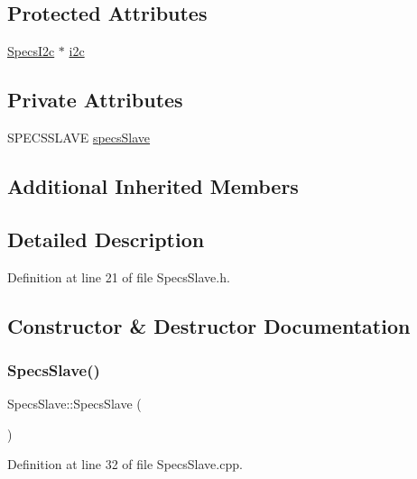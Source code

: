 \subsection*{Protected Attributes}
\begin{DoxyCompactItemize}
\item 
\hyperlink{classSpecsI2c}{Specs\+I2c} $\ast$ \hyperlink{classSpecsSlave_a5210e5a45c381ee29a830b42119ec1d3}{i2c}
\end{DoxyCompactItemize}
\subsection*{Private Attributes}
\begin{DoxyCompactItemize}
\item 
S\+P\+E\+C\+S\+S\+L\+A\+VE \hyperlink{classSpecsSlave_a98f0190d671023c3d874088ea2bd874b}{specs\+Slave}
\end{DoxyCompactItemize}
\subsection*{Additional Inherited Members}


\subsection{Detailed Description}


Definition at line 21 of file Specs\+Slave.\+h.



\subsection{Constructor \& Destructor Documentation}
\mbox{\label{classSpecsSlave_a4170ce73e2fd5ce2b8a7b8ef55226556}} 
\subsubsection{\texorpdfstring{Specs\+Slave()}{SpecsSlave()}}
{\footnotesize\ttfamily Specs\+Slave\+::\+Specs\+Slave (\begin{DoxyParamCaption}{ }\end{DoxyParamCaption})}



Definition at line 32 of file Specs\+Slave.\+cpp.




